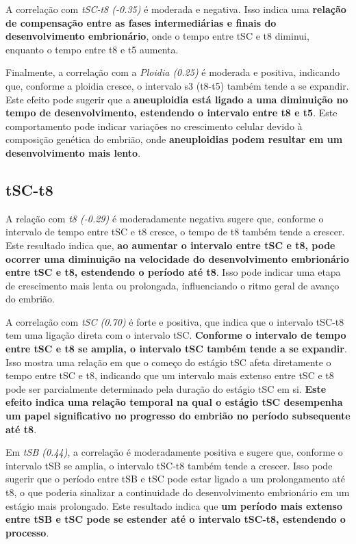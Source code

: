 A correlação com \textit{tSC-t8 (-0.35)} é moderada e negativa. Isso indica uma \textbf{relação de compensação entre as fases intermediárias e finais do desenvolvimento embrionário}, onde o tempo entre tSC e t8 diminui, enquanto o tempo entre t8 e t5 aumenta.

Finalmente, a correlação com a \textit{Ploidia (0.25)} é moderada e positiva, indicando que, conforme a ploidia cresce, o intervalo s3 (t8-t5) também tende a se expandir. Este efeito pode sugerir que a \textbf{aneuploidia está ligado a uma diminuição no tempo de desenvolvimento, estendendo o intervalo entre t8 e t5}. Este comportamento pode indicar variações no crescimento celular devido à composição genética do embrião, onde \textbf{aneuploidias podem resultar em um desenvolvimento mais lento}.

\subsection*{tSC-t8}
A relação com \textit{t8 (-0.29)} é moderadamente negativa sugere que, conforme o intervalo de tempo entre tSC e t8 cresce, o tempo de t8 também tende a crescer. Este resultado indica que,\textbf{ ao aumentar o intervalo entre tSC e t8, pode ocorrer uma diminuição na velocidade do desenvolvimento embrionário entre tSC e t8, estendendo o período até t8}. Isso pode indicar uma etapa de crescimento mais lenta ou prolongada, influenciando o ritmo geral de avanço do embrião.

A correlação com \textit{tSC (0.70)} é forte e positiva, que indica que o intervalo tSC-t8 tem uma ligação direta com o intervalo tSC. \textbf{Conforme o intervalo de tempo entre tSC e t8 se amplia, o intervalo tSC também tende a se expandir}. Isso mostra uma relação em que o começo do estágio tSC afeta diretamente o tempo entre tSC e t8, indicando que um intervalo mais extenso entre tSC e t8 pode ser parcialmente determinado pela duração do estágio tSC em si. \textbf{Este efeito indica uma relação temporal na qual o estágio tSC desempenha um papel significativo no progresso do embrião no período subsequente até t8}.

Em \textit{tSB (0.44)}, a correlação é moderadamente positiva e sugere que, conforme o intervalo tSB se amplia, o intervalo tSC-t8 também tende a crescer. Isso pode sugerir que o período entre tSB e tSC pode estar ligado a um prolongamento até t8, o que poderia sinalizar a continuidade do desenvolvimento embrionário em um estágio mais prolongado. Este resultado indica que\textbf{ um período mais extenso entre tSB e tSC pode se estender até o intervalo tSC-t8, estendendo o processo}.

